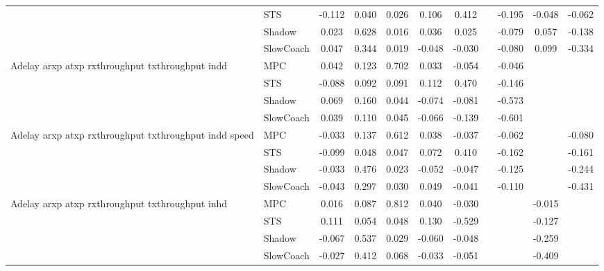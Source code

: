 \begin{tabular}{|l|l|*{9}{c|}}
                              & STS &   -0.112 &     0.040 &     0.026 &  0.106 &  0.412 &     &  -0.195 &  -0.048 &   -0.062 \\
                              & Shadow &    0.023 &     0.628 &     0.016 &  0.036 &  0.025 &     &  -0.079 &   0.057 &   -0.138 \\
                              & SlowCoach &    0.047 &     0.344 &     0.019 & -0.048 & -0.030 &     &  -0.080 &   0.099 &   -0.334 \\
\midrule
Adelay arxp atxp rxthroughput txthroughput indd    & MPC &    0.042 &     0.123 &     0.702 &  0.033 & -0.054 &     &  -0.046 &      &       \\
                              & STS &   -0.088 &     0.092 &     0.091 &  0.112 &  0.470 &     &  -0.146 &      &       \\
                              & Shadow &    0.069 &     0.160 &     0.044 & -0.074 & -0.081 &     &  -0.573 &      &       \\
                              & SlowCoach &    0.039 &     0.110 &     0.045 & -0.066 & -0.139 &     &  -0.601 &      &       \\
\midrule
Adelay arxp atxp rxthroughput txthroughput indd speed    & MPC &   -0.033 &     0.137 &     0.612 &  0.038 & -0.037 &     &  -0.062 &      &   -0.080 \\
                              & STS &   -0.099 &     0.048 &     0.047 &  0.072 &  0.410 &     &  -0.162 &      &   -0.161 \\
                              & Shadow &   -0.033 &     0.476 &     0.023 & -0.052 & -0.047 &     &  -0.125 &      &   -0.244 \\
                              & SlowCoach &   -0.043 &     0.297 &     0.030 &  0.049 & -0.041 &     &  -0.110 &      &   -0.431 \\
\midrule
Adelay arxp atxp rxthroughput txthroughput inhd    & MPC &    0.016 &     0.087 &     0.812 &  0.040 & -0.030 &     &      &  -0.015 &       \\
                              & STS &    0.111 &     0.054 &     0.048 &  0.130 & -0.529 &     &      &  -0.127 &       \\
                              & Shadow &   -0.067 &     0.537 &     0.029 & -0.060 & -0.048 &     &      &  -0.259 &       \\
                              & SlowCoach &   -0.027 &     0.412 &     0.068 & -0.033 & -0.051 &     &      &  -0.409 &       \\

\end{tabular}
